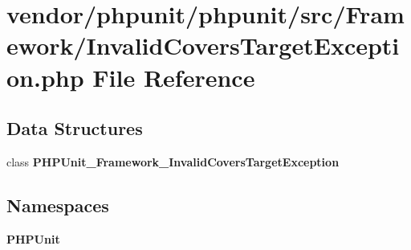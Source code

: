 \section{vendor/phpunit/phpunit/src/\+Framework/\+Invalid\+Covers\+Target\+Exception.php File Reference}
\label{_invalid_covers_target_exception_8php}
\subsection*{Data Structures}
\begin{DoxyCompactItemize}
\item 
class {\bf P\+H\+P\+Unit\+\_\+\+Framework\+\_\+\+Invalid\+Covers\+Target\+Exception}
\end{DoxyCompactItemize}
\subsection*{Namespaces}
\begin{DoxyCompactItemize}
\item 
 {\bf P\+H\+P\+Unit}
\end{DoxyCompactItemize}
